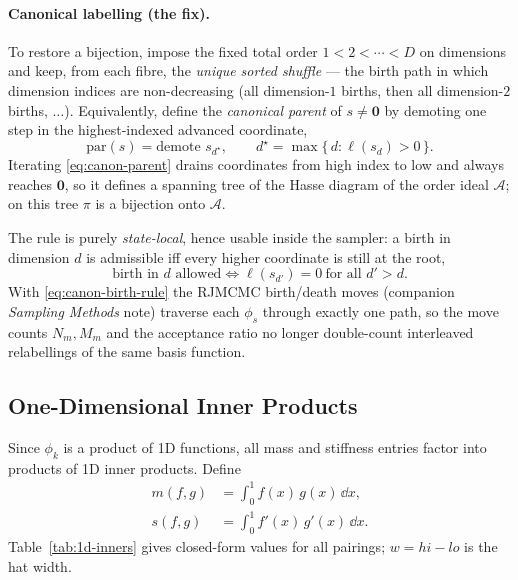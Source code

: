 \documentclass[11pt]{article}
\begin{document}
\paragraph{Canonical labelling (the fix).}
To restore a bijection, impose the fixed total order $1<2<\cdots<D$ on
dimensions and keep, from each fibre, the \emph{unique sorted shuffle} --- the
birth path in which dimension indices are non-decreasing (all dimension-$1$
births, then all dimension-$2$ births, $\dots$).  Equivalently, define the
\emph{canonical parent} of $s\ne\mathbf 0$ by demoting one step in the
highest-indexed advanced coordinate,
\begin{equation}
  \mathrm{par}(s) = \text{demote } s_{d^\star},
  \qquad
  d^\star = \max\{\,d : \ell(s_d)>0\,\}.
  \label{eq:canon-parent}
\end{equation}
Iterating \eqref{eq:canon-parent} drains coordinates from high index to low and
always reaches $\mathbf 0$, so it defines a spanning tree of the Hasse diagram
of the order ideal $\mathcal{A}$; on this tree $\pi$ is a bijection onto
$\mathcal{A}$.

The rule is purely \emph{state-local}, hence usable inside the sampler: a birth
in dimension $d$ is admissible iff every higher coordinate is still at the root,
\begin{equation}
  \text{birth in } d \text{ allowed}
  \iff
  \ell(s_{d'}) = 0 \ \text{for all } d'>d.
  \label{eq:canon-birth-rule}
\end{equation}
With \eqref{eq:canon-birth-rule} the RJMCMC birth/death moves (companion
\emph{Sampling Methods} note) traverse each $\phi_s$ through exactly one path, so
the move counts $N_m,M_m$ and the acceptance ratio no longer double-count
interleaved relabellings of the same basis function.

\subsection{One-Dimensional Inner Products}
\label{sec:1d-inners}

Since $\phi_k$ is a product of 1D functions, all mass and stiffness entries
factor into products of 1D inner products.  Define
\begin{align}
  m(f, g) &= \int_0^1 f(x)\,g(x)\,\dd x, \label{eq:mfg} \\
  s(f, g) &= \int_0^1 f'(x)\,g'(x)\,\dd x. \label{eq:sfg}
\end{align}
Table~\ref{tab:1d-inners} gives closed-form values for all pairings;
$w = hi-lo$ is the hat width.
\end{document}

